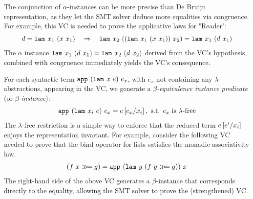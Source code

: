 %

The conjunction of $\alpha$-instances
can be more precise than De Bruijn
representation, as they let the SMT
solver deduce more equalities via
congruence.
%
For example, this VC is needed
to prove the applicative laws for "Reader":
%
$$
d = \slam{x_1}{(\sapp{x}{x_1})}
  \quad
  \Rightarrow
  \quad
  \slam{x_2}{(\sapp{(\slam{x_1}{(\sapp{x}{x_1})})}{x_2})}
  = \slam{x_1}{(\sapp{d}{x_1})}
$$
%
The $\alpha$ instance
%
${\slam{x_1}{(\sapp{d}{x_1})} = \slam{x_2}{(\sapp{d}{x_2})}}$
%
derived from the VC's hypothesis,
combined with congruence immediately
yields the VC's consequence.

%
For each syntactic term $\smapp{(\slam{x}{e})}{e_x}$,
with $e_x$ not containing any $\lambda$-abstractions,
appearing in the VC, we generate a \emph{$\beta$-equivalence
instance predicate} (or \emph{$\beta$-instance}):
$$
\smapp{(\slam{x_i}{e})}{e_x} = \SUBST{e}{x_i}{e_x},
  \mbox{ s.t. } e_x \mbox{ is $\lambda$-free}
$$
%
The $\lambda$-free restriction is a simple way
to enforce that the reduced term ${\SUBST{e}{x_i}{e'}}$
enjoys the representation invariant.
%
%
For example, consider the following VC
needed to prove that the bind operator for
lists satisfies the monadic associativity law.
%
$$(\sapp{f}{x} \ebind g) = \smapp{(\slam{y}{(\sapp{f}{y} \ebind g)})}{x}$$
%
The right-hand side of the above VC generates
a $\beta$-instance that corresponds directly
to the equality, allowing the SMT solver to
prove the (strengthened) VC.



